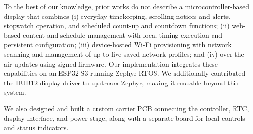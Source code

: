 To the best of our knowledge, prior works do not describe a microcontroller-based display that combines (i) everyday timekeeping, scrolling notices and alerts, stopwatch operation, and scheduled count-up and countdown functions; (ii) web-based content and schedule management with local timing execution and persistent configuration; (iii) device-hosted Wi-Fi provisioning with network scanning and management of up to five saved network profiles; and (iv) over-the-air updates using signed firmware. Our implementation integrates these capabilities on an ESP32-S3 running Zephyr RTOS. We additionally contributed the HUB12 display driver to upstream Zephyr, making it reusable beyond this system.

We also designed and built a custom carrier PCB connecting the controller, RTC, display interface, and power stage, along with a separate board for local controls and status indicators.